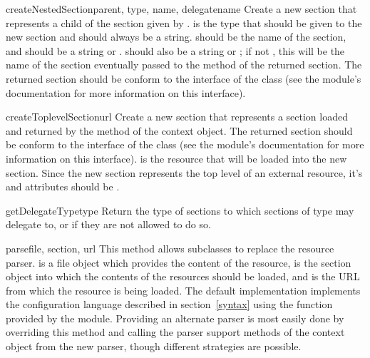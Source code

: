 \documentclass{howto}
\begin{document}
\begin{methoddesc}{createNestedSection}{parent, type, name, delegatename}
  Create a new section that represents a child of the section given by
  .   is the type that should be given to the
  new section and should always be a string.   should be the
  name of the section, and should be a string or .
   should also be a string or ; if not
  , this will be the name of the section eventually passed
  to the  method of the returned section.  The
  returned section should be conform to the interface of the
   class (see the 
  module's documentation for more information on this interface).
\end{methoddesc}

\begin{methoddesc}{createToplevelSection}{url}
  Create a new section that represents a section loaded and returned
  by the  method of the context object.  The returned
  section should be conform to the interface of the
   class (see the
   module's documentation for more
  information on this interface).   is the resource that will
  be loaded into the new section.
  Since the new section represents the top level of an external
  resource, it's  and  attributes should be
  .
\end{methoddesc}

\begin{methoddesc}{getDelegateType}{type}
  Return the type of sections to which sections of type  may
  delegate to, or  if they are not allowed to do so.
\end{methoddesc}

\begin{methoddesc}{parse}{file, section, url}
  This method allows subclasses to replace the resource parser.
   is a file object which provides the content of the
  resource,  is the section object into which the
  contents of the resources should be loaded, and  is the URL
  from which the resource is being loaded.  The default implementation
  implements the configuration language described in
  section~\ref{syntax} using the  function provided
  by the  module.  Providing an
  alternate parser is most easily done by overriding this method and
  calling the parser support methods of the context object from the
  new parser, though different strategies are possible.
\end{methoddesc}
\end{document}
